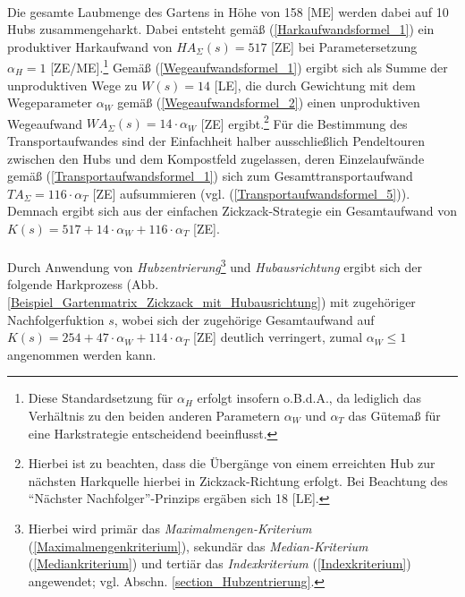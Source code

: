 \phantom \\
\noindent Die gesamte Laubmenge des Gartens in Höhe von 158 [ME] werden dabei auf 10 Hubs zusammengeharkt. Dabei entsteht gemäß (\ref{Harkaufwandsformel_1}) ein produktiver Harkaufwand von $HA_{\Sigma}(s)=517$ [ZE] bei Parametersetzung $\alpha_H = 1$ [ZE/ME].\footnote{Diese Standardsetzung für $\alpha_H$ erfolgt insofern o.B.d.A., da lediglich das Verhältnis zu den beiden anderen Parametern $\alpha_W$ und $\alpha_T$ das Gütemaß für eine Harkstrategie entscheidend beeinflusst.} Gemäß (\ref{Wegeaufwandsformel_1}) ergibt sich als Summe der unproduktiven Wege zu $W(s)=14$ [LE], die durch Gewichtung mit dem Wegeparameter $\alpha_W$ gemäß (\ref{Wegeaufwandsformel_2}) einen unproduktiven Wegeaufwand $WA_{\Sigma}(s) = 14 \cdot \alpha_W$ [ZE] ergibt.\footnote{Hierbei ist zu beachten, dass die Übergänge von einem erreichten Hub zur nächsten Harkquelle hierbei in Zickzack-Richtung erfolgt. Bei Beachtung des "`Nächster Nachfolger"'-Prinzips ergäben sich 18 [LE].} Für die Bestimmung des Transportaufwandes sind der Einfachheit halber ausschließlich Pendeltouren zwischen den Hubs und dem Kompostfeld zugelassen, deren Einzelaufwände gemäß (\ref{Transportaufwandsformel_1}) sich zum Gesamttransportaufwand $TA_{\Sigma} = 116\cdot \alpha_T$ [ZE] aufsummieren (vgl. (\ref{Transportaufwandsformel_5})). Demnach ergibt sich aus der einfachen Zickzack-Strategie ein Gesamtaufwand von $K(s) = 517 + 14 \cdot \alpha_W + 116\cdot \alpha_T$ [ZE]. \\
\\
Durch Anwendung von \textit{Hubzentrierung}\footnote{Hierbei wird primär das \textit{Maximalmengen-Kriterium} (\ref{Maximalmengenkriterium}), sekundär das \textit{Median-Kriterium} (\ref{Mediankriterium}) und tertiär das \textit{Indexkriterium} (\ref{Indexkriterium}) angewendet; vgl. Abschn. \ref{section_Hubzentrierung}.} und \textit{Hubausrichtung} ergibt sich der folgende Harkprozess (Abb. \ref{Beispiel_Gartenmatrix_Zickzack_mit_Hubausrichtung}) mit zugehöriger Nachfolgerfuktion $s$, wobei sich der zugehörige Gesamtaufwand auf $K(s) = 254 + 47 \cdot \alpha_W + 114 \cdot \alpha_T$ [ZE] deutlich verringert, zumal $\alpha_W \leq 1$ angenommen werden kann.


